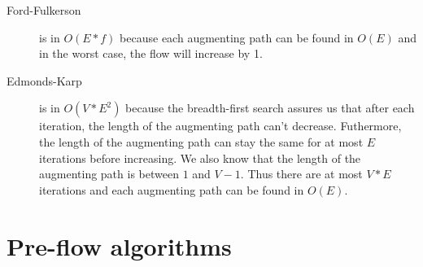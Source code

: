 \begin{description}
\item[Ford-Fulkerson]{is in $O(E*f)$ because each augmenting path can be found in $O(E)$ and in the worst case, the flow will increase by 1.}
\item[Edmonds-Karp]{is in $O(V*E^2)$ because the breadth-first search assures us that after each iteration, the length of the augmenting path can't decrease. Futhermore, the length of the augmenting path can stay the same for at most $E$ iterations before increasing. We also know that the length of the augmenting path is between $1$ and $V-1$. Thus there are at most $V*E$ iterations and each augmenting path can be found in $O(E)$.}
\end{description}


\section{Pre-flow algorithms}
